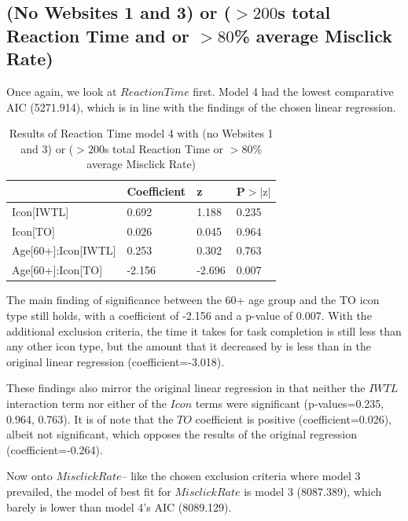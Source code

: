 \documentclass[12pt,twoside]{reedthesis}
\begin{document}
\subsection{(No Websites 1 and 3) or ($>200$s total Reaction Time and or $>80$\% average Misclick Rate)}\label{4.3.2}

    Once again, we look at $ReactionTime$ first. Model 4 had the lowest comparative AIC (5271.914), which is in line with the findings of the chosen linear regression.

    \begin{table}[H]
        \centering
        \begin{tabular}{| p{5cm} | p{2.5cm} | p{2.5cm} | p{2.5cm} |}
            \hline
            & Coefficient & z & P$>|\text{z}|$\\
            \hline
            Icon[IWTL] & 0.692 &  1.188 & 0.235\\
            \hline
            Icon[TO] & 0.026 & 0.045 & 0.964\\
            \hline
            Age[60+]:Icon[IWTL] & 0.253 &  0.302 & 0.763\\
            \hline
            Age[60+]:Icon[TO] & -2.156 & -2.696 & 0.007\\
            \hline
        \end{tabular}
        \caption{Results of Reaction Time model 4 with (no Websites 1 and 3) or ($>200$s total Reaction Time or $>80$\% average Misclick Rate)}
        \label{n13_8_ppl_speed_m4}
    \end{table}

    The main finding of significance between the 60+ age group and the TO icon type still holds, with a coefficient of -2.156 and a p-value of 0.007. With the additional exclusion criteria, the time it takes for task completion is still less than any other icon type, but the amount that it decreased by is less than in the original linear regression (coefficient=-3.018).

    These findings also mirror the original linear regression in that neither the $IWTL$ interaction term nor either of the $Icon$ terms were significant (p-values=0.235, 0.964, 0.763). It is of note that the $TO$ coefficient is positive (coefficient=0.026), albeit not significant, which opposes the results of the original regression (coefficient=-0.264). 

    Now onto $Misclick Rate$-- like the chosen exclusion criteria where model 3 prevailed, the model of best fit for $Misclick Rate$ is model 3 (8087.389), which barely is lower than model 4's AIC (8089.129). 
\end{document}
